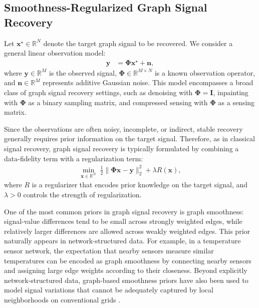 \subsection{Smoothness-Regularized Graph Signal Recovery}
\label{subsec:smoothness_regularized_recovery}

Let $\mathbf{x}^{\star}\in\mathbb{R}^{N}$ denote the target graph signal to be recovered. We consider a general linear observation model:
\begin{equation}
\begin{aligned}
\mathbf{y} &= \boldsymbol{\Phi}\mathbf{x}^{\star}+\mathbf{n},
\end{aligned}
\label{eq:observation_model}
\end{equation}
where $\mathbf{y}\in\mathbb{R}^{M}$ is the observed signal, $\boldsymbol{\Phi}\in\mathbb{R}^{M\times N}$ is a known observation operator, and $\mathbf{n}\in\mathbb{R}^{M}$ represents additive Gaussian noise. This model encompasses a broad class of graph signal recovery settings, such as denoising with $\boldsymbol{\Phi}=\mathbf{I}$, inpainting with $\boldsymbol{\Phi}$ as a binary sampling matrix, and compressed sensing with $\boldsymbol{\Phi}$ as a sensing matrix.

Since the observations are often noisy, incomplete, or indirect, stable recovery generally requires prior information on the target signal. Therefore, as in classical signal recovery, graph signal recovery is typically formulated by combining a data-fidelity term with a regularization term:
\begin{equation}
\begin{aligned}
\min_{\mathbf{x}\in\mathbb{R}^{N}}\;
\frac{1}{2}\lVert \boldsymbol{\Phi}\mathbf{x}-\mathbf{y}\rVert_{2}^{2}
+\lambda R(\mathbf{x}),
\end{aligned}
\label{eq:typical_regularized_recovery}
\end{equation}
where $R$ is a regularizer that encodes prior knowledge on the target signal, and $\lambda>0$ controls the strength of regularization.

One of the most common priors in graph signal recovery is graph smoothness: signal-value differences tend to be small across strongly weighted edges, while relatively larger differences are allowed across weakly weighted edges. This prior naturally appears in network-structured data. For example, in a temperature sensor network, the expectation that nearby sensors measure similar temperatures can be encoded as graph smoothness by connecting nearby sensors and assigning large edge weights according to their closeness. Beyond explicitly network-structured data, graph-based smoothness priors have also been used to model signal variations that cannot be adequately captured by local neighborhoods on conventional grids \cite{tmp}.

